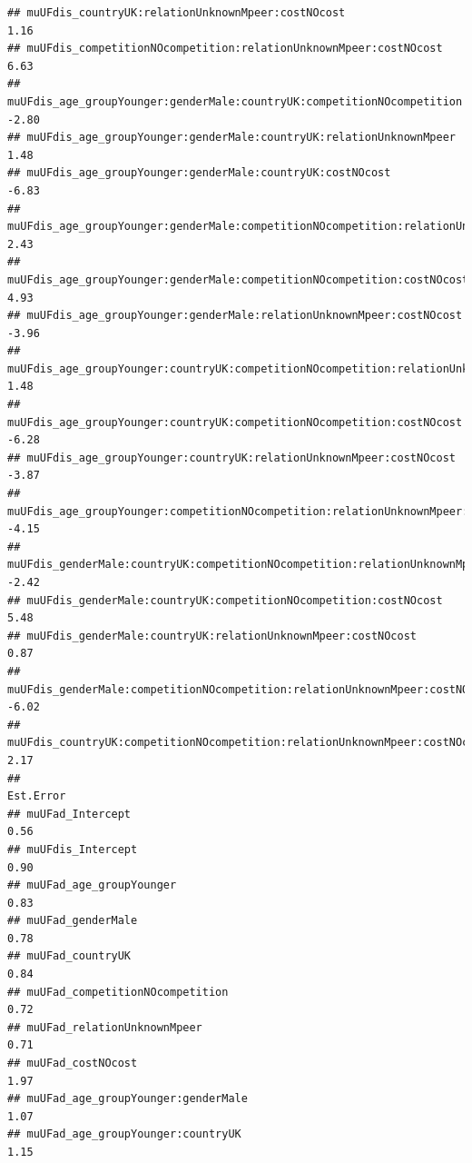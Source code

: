 \documentclass[
]{article}
\begin{document}
\begin{verbatim}
## muUFdis_countryUK:relationUnknownMpeer:costNOcost                                     1.16
## muUFdis_competitionNOcompetition:relationUnknownMpeer:costNOcost                      6.63
## muUFdis_age_groupYounger:genderMale:countryUK:competitionNOcompetition               -2.80
## muUFdis_age_groupYounger:genderMale:countryUK:relationUnknownMpeer                    1.48
## muUFdis_age_groupYounger:genderMale:countryUK:costNOcost                             -6.83
## muUFdis_age_groupYounger:genderMale:competitionNOcompetition:relationUnknownMpeer     2.43
## muUFdis_age_groupYounger:genderMale:competitionNOcompetition:costNOcost               4.93
## muUFdis_age_groupYounger:genderMale:relationUnknownMpeer:costNOcost                  -3.96
## muUFdis_age_groupYounger:countryUK:competitionNOcompetition:relationUnknownMpeer      1.48
## muUFdis_age_groupYounger:countryUK:competitionNOcompetition:costNOcost               -6.28
## muUFdis_age_groupYounger:countryUK:relationUnknownMpeer:costNOcost                   -3.87
## muUFdis_age_groupYounger:competitionNOcompetition:relationUnknownMpeer:costNOcost    -4.15
## muUFdis_genderMale:countryUK:competitionNOcompetition:relationUnknownMpeer           -2.42
## muUFdis_genderMale:countryUK:competitionNOcompetition:costNOcost                      5.48
## muUFdis_genderMale:countryUK:relationUnknownMpeer:costNOcost                          0.87
## muUFdis_genderMale:competitionNOcompetition:relationUnknownMpeer:costNOcost          -6.02
## muUFdis_countryUK:competitionNOcompetition:relationUnknownMpeer:costNOcost            2.17
##                                                                                   Est.Error
## muUFad_Intercept                                                                       0.56
## muUFdis_Intercept                                                                      0.90
## muUFad_age_groupYounger                                                                0.83
## muUFad_genderMale                                                                      0.78
## muUFad_countryUK                                                                       0.84
## muUFad_competitionNOcompetition                                                        0.72
## muUFad_relationUnknownMpeer                                                            0.71
## muUFad_costNOcost                                                                      1.97
## muUFad_age_groupYounger:genderMale                                                     1.07
## muUFad_age_groupYounger:countryUK                                                      1.15

\end{verbatim}
\end{document}
